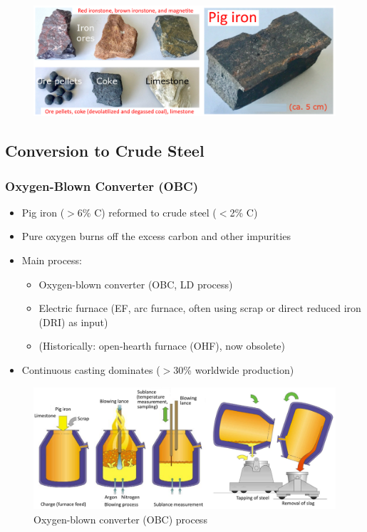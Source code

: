 \documentclass{article}
\begin{document}
\begin{figure}[ht!]
  \centering
  \includegraphics[width=\textwidth]{media/pig_iron.png}
\end{figure}

\subsection{Conversion to Crude Steel}
\subsubsection{Oxygen-Blown Converter (OBC)}
\begin{itemize}
  \item Pig iron ($>$6\% C) reformed to crude steel ($<$2\% C)
  \item Pure oxygen burns off the excess carbon and other impurities
  \item Main process:
  \begin{itemize}
    \item Oxygen-blown converter (OBC, LD process)
    \item Electric furnace (EF, arc furnace, often using scrap or direct reduced iron (DRI) as input)
    \item (Historically: open-hearth furnace (OHF), now obsolete)
  \end{itemize}
  \item Continuous casting dominates ($>$30\% worldwide production)
\end{itemize}

\newpage
\begin{figure}[ht!]
  \centering
  \includegraphics[width=\textwidth]{media/creation_crudesteel.png}
  \caption*{Oxygen-blown converter (OBC) process}
\end{figure}
\end{document}

